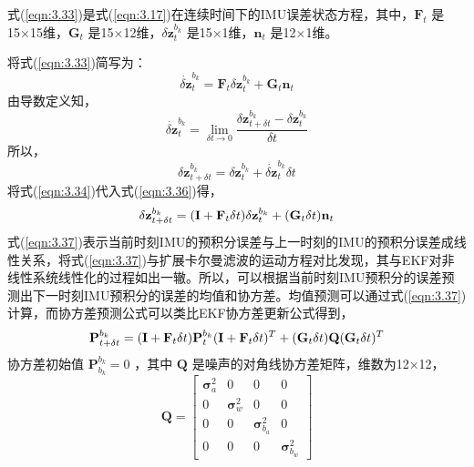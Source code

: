 式(\ref{eqn:3.33})是式(\ref{eqn:3.17})在连续时间下的IMU误差状态方程，其中，$ \mathbf{F}_t $ 是15×15维，$ \mathbf{G}_t $ 是15×12维，$ \delta \mathbf{z}_t^{b_k}$ 是15×1维，$\mathbf{n}_t $ 是12×1维。

将式(\ref{eqn:3.33})简写为：
\begin{equation}
\label{eqn:3.34}
\dot{\delta \mathbf{z}}_t^{b_k} = \mathbf{F}_t \delta \mathbf{z}_t^{b_k} + \mathbf{G}_t\mathbf{n}_t
\end{equation}
由导数定义知，
\begin{equation}
\label{eqn:3.35}
\dot{\delta \mathbf{z}}_t^{b_k} = \lim _{\delta t \rightarrow 0} \frac{\delta \mathbf{z}_{t+\delta t}^{b_k} - \delta \mathbf{z}_t^{b_k}}{\delta t}
\end{equation}
所以，
\begin{equation}
\label{eqn:3.36}
\delta \mathbf{z}_{t+\delta t}^{b_k} = \delta \mathbf{z}_t^{b_k} + \dot{\delta \mathbf{z}}_t^{b_k} \delta t
\end{equation}
将式(\ref{eqn:3.34})代入式(\ref{eqn:3.36})得，
\begin{equation}
\label{eqn:3.37}
\setlength{\abovedisplayskip}{6pt}
\setlength{\belowdisplayskip}{6pt}
\delta \mathbf{z}_{t+\delta t}^{b_k} = ( \mathbf{I}+ \mathbf{F}_t \delta t )\delta \mathbf{z}_t^{b_k} + ( \mathbf{G}_t \delta t )\mathbf{n}_t
\end{equation}
式(\ref{eqn:3.37})表示当前时刻IMU的预积分误差与上一时刻的IMU的预积分误差成线性关系，将式(\ref{eqn:3.37})与扩展卡尔曼滤波的运动方程对比发现，其与EKF对非线性系统线性化的过程如出一辙。所以，可以根据当前时刻IMU预积分的误差预测出下一时刻IMU预积分的误差的均值和协方差。均值预测可以通过式(\ref{eqn:3.37})计算，而协方差预测公式可以类比EKF协方差更新公式得到，
\begin{equation}
\label{eqn:3.38}
\setlength{\abovedisplayskip}{6pt}
\setlength{\belowdisplayskip}{6pt}
\mathbf{P}_{t+\delta t}^{b_k}=(\mathbf{I}+\mathbf{F}_t\delta t)\mathbf{P}_t^{b_k}(\mathbf{I}+\mathbf{F}_t\delta t)^T+(\mathbf{G}_t\delta t)\mathbf{Q}(\mathbf{G}_t\delta t)^T
\end{equation}
协方差初始值 $\mathbf{P}_{b_k}^{b_k}=0 $ ，其中 $\mathbf{Q} $ 是噪声的对角线协方差矩阵，维数为12×12，
\begin{equation}
\label{eqn:3.39}
\mathbf{Q} =\left[ \begin{array}{cccc}
{\bm{\sigma}_{a}^{2}} & {0} & {0} & {0} \\ 
{0} & {\bm{\sigma}_{w}^{2}} & {0} & {0} \\ 
{0} & {0} & {\bm{\sigma}_{b_{a}}^{2}} & {0} \\ 
{0} & {0} & {0} & {\bm{\sigma}_{b_{w}}^{2}
}\end{array}\right]
\end{equation}

